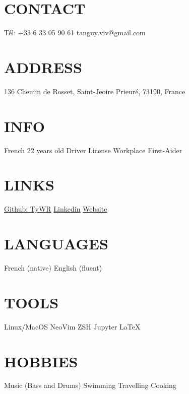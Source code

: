 \documentclass[]{cv-style}
\begin{document}
\begin{aside}
%
\section{CONTACT} \vspace{0.1cm}
Tél: +33 6 33 05 90 61
tanguy.viv@gmail.com
%
\section{ADDRESS} \vspace{0.1cm}
136 Chemin de Rosset,
Saint-Jeoire Prieuré,
73190,
France
%
\section{INFO} \vspace{0.1cm}
French
22 years old
Driver License
Workplace First-Aider
%
\section{LINKS} \vspace{0.1cm}
\href{https://github.com/TyWR}{Github: TyWR}
\href{https://www.linkedin.com/in/tanguy-vivier/}{Linkedin}
\href{https://tywr.github.io/}{Website}
%
\section{LANGUAGES} \vspace{0.1cm}
French (native)
English (fluent)
%
\section{TOOLS} \vspace{0.1cm}
Linux/MacOS
NeoVim
ZSH
Jupyter
\LaTeX{}
%
\section{HOBBIES} \vspace{0.1cm}
Music
(Bass and Drums)
Swimming
Travelling
Cooking
%
\end{aside}
\end{document}
